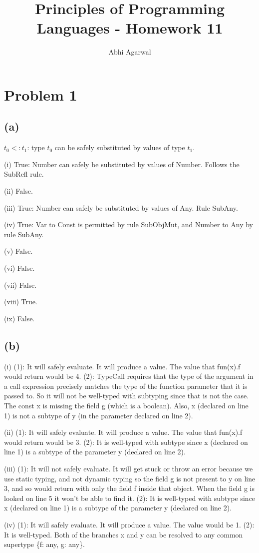 \documentclass[11pt, oneside]{article}
\title{Principles of Programming Languages - Homework 11}
\author{Abhi Agarwal}
\date{}
\begin{document}
\maketitle
\section{Problem 1}
\subsection*{(a)} 

\indent \par $t_0 <: t_1$: type $t_0$ can be safely substituted by values of type $t_1$.
\par (i) True: Number can safely be substituted by values of Number. Follows the SubRefl rule.
\par (ii) False.
\par (iii) True: Number can safely be substituted by values of Any. Rule SubAny.
\par (iv) True: Var to Const is permitted by rule SubObjMut, and Number to Any by rule SubAny.
\par (v) False.
\par (vi) False.
\par (vii) False.
\par (viii) True.
\par (ix) False.

\subsection*{(b)} 
\par (i) (1): It will safely evaluate. It will produce a value. The value that fun(x).f would return would be 4. (2): TypeCall requires that the type of the argument in a call expression precisely matches the type of the function parameter that it is passed to. So it will not be well-typed with subtyping since that is not the case. The const x is missing the field g (which is a boolean). Also, x (declared on line 1) is not a subtype of y (in the parameter declared on line 2).
\par (ii) (1): It will safely evaluate. It will produce a value. The value that fun(x).f would return would be 3. (2): It is well-typed with subtype since x (declared on line 1) is a subtype of the parameter y (declared on line 2).
\par (iii) (1): It will not safely evaluate. It will get stuck or throw an error because we use static typing, and not dynamic typing so the field g is not present to y on line 3, and so would return with only the field f inside that object. When the field g is looked on line 5 it won't be able to find it. (2): It is well-typed with subtype since x (declared on line 1) is a subtype of the parameter y (declared on line 2).
\par (iv) (1): It will safely evaluate. It will produce a value. The value would be 1. (2):	It is well-typed. Both of the branches x and y can be resolved to any common supertype \{f: any, g: any\}.
\end{document}
